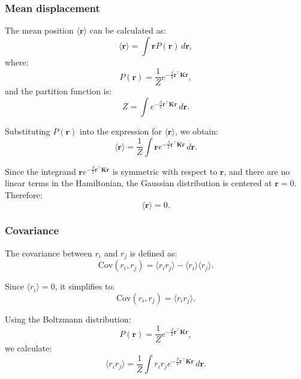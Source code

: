 \documentclass[English, Lau, oneside]{sapthesis}
\begin{document}
\subsubsection{Mean displacement}
\noindent The mean position \(\langle \mathbf{r} \rangle\) can be calculated as:\cite{ref12}
\begin{equation}
    \langle \mathbf{r} \rangle = \int \mathbf{r} P(\mathbf{r}) \, d\mathbf{r},
\end{equation}
where:
\begin{equation}
    P(\mathbf{r}) = \frac{1}{Z} e^{-\frac{\beta}{2} \mathbf{r}^\top \mathbf{K} \mathbf{r}},
\end{equation}
and the partition function is:\cite{ref12}
\begin{equation}
    Z = \int e^{-\frac{\beta}{2} \mathbf{r}^\top \mathbf{K} \mathbf{r}} \, d\mathbf{r}.
\end{equation}

Substituting \(P(\mathbf{r})\) into the expression for \(\langle \mathbf{r} \rangle\), we obtain:
\begin{equation}
    \langle \mathbf{r} \rangle = \frac{1}{Z} \int \mathbf{r} e^{-\frac{\beta}{2} \mathbf{r}^\top \mathbf{K} \mathbf{r}} \, d\mathbf{r}.
\end{equation}

Since the integrand \(\mathbf{r} e^{-\frac{\beta}{2} \mathbf{r}^\top \mathbf{K} \mathbf{r}}\) is symmetric with respect to \(\mathbf{r}\), and there are no linear terms in the Hamiltonian, the Gaussian distribution is centered at \(\mathbf{r} = 0\). Therefore:\cite{ref12}
\begin{equation}
    \langle \mathbf{r} \rangle = 0.
\end{equation}

\subsubsection{Covariance}
\noindent The covariance between \(r_i\) and \(r_j\) is defined as:\cite{ref12}
\begin{equation}
    \text{Cov}(r_i, r_j) = \langle r_i r_j \rangle - \langle r_i \rangle \langle r_j \rangle.
\end{equation}

Since \(\langle r_i \rangle = 0\), it simplifies to:
\begin{equation}
    \text{Cov}(r_i, r_j) = \langle r_i r_j \rangle.
\end{equation}

Using the Boltzmann distribution:
\begin{equation}
    P(\mathbf{r}) = \frac{1}{Z} e^{-\frac{\beta}{2} \mathbf{r}^\top \mathbf{K} \mathbf{r}},
\end{equation}
we calculate:
\begin{equation}
    \langle r_i r_j \rangle = \frac{1}{Z} \int r_i r_j e^{-\frac{\beta}{2} \mathbf{r}^\top \mathbf{K} \mathbf{r}} \, d\mathbf{r}.
\end{equation}
\end{document}
